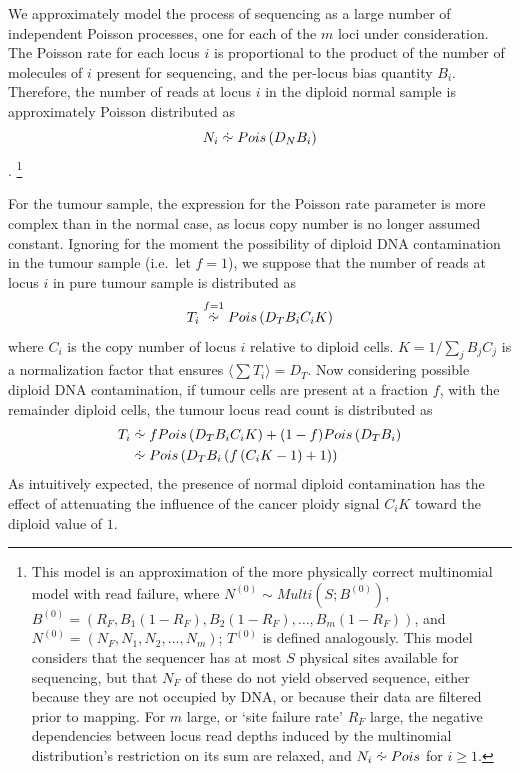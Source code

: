 \documentclass[thesis.tex]{subfiles}
\begin{document}
We approximately model the process of sequencing as a large number of independent Poisson processes, one for each of the $m$ loci under consideration.  The Poisson rate for each locus $i$ is proportional to the product of the number of molecules of $i$ present for sequencing, and the per-locus bias quantity $B_i$.  Therefore, the number of reads at locus $i$ in the diploid normal sample is approximately Poisson distributed as
\begin{equation}
  N_i \approxdist Pois\left(D_N B_i\right) \label{eq:comp_cnv_Npois}
\end{equation}. \footnote{This model is an approximation of the more physically correct multinomial model with read failure, where $N^{(0)} \sim Multi\left(S; B^{(0)}\right)$, $B^{(0)} = \left(R_F, B_1(1-R_F), B_2(1-R_F), \dots, B_m(1-R_F)\right)$, and $N^{(0)} = \left(N_F, N_1, N_2, \dots, N_m\right)$; $T^{(0)}$ is defined analogously.  This model considers that the sequencer has at most $S$ physical sites available for sequencing, but that $N_F$ of these do not yield observed sequence, either because they are not occupied by DNA, or because their data are filtered prior to mapping.  For $m$ large, or `site failure rate' $R_F$ large, the negative dependencies between locus read depths induced by the multinomial distribution's restriction on its sum are relaxed, and $N_i \approxdist Pois$ for $i \geq 1$.}

For the tumour sample, the expression for the Poisson rate parameter is more complex than in the normal case, as locus copy number is no longer assumed constant.  Ignoring for the moment the possibility of diploid DNA contamination in the tumour sample (i.e.\ let $f = 1$), we suppose that the number of reads at locus $i$ in pure tumour sample is distributed as
\begin{equation}
  T_i \overset{f = 1}{\approxdist} Pois\left(D_T B_i C_i K \right)
  \label{eq:comp_cnv_Tpois_pure}
\end{equation}
where $C_i$ is the copy number of locus $i$ relative to diploid cells.  $K = 1/\sum_{j} B_j C_j$ is a normalization factor that ensures $\langle \sum T_i \rangle = D_T$.  Now considering possible diploid DNA contamination, if tumour cells are present at a fraction $f$, with the remainder diploid cells, the tumour locus read count is distributed as
\begin{align}
  T_i &\approxdist f Pois\left(D_T B_i C_i K \right) + (1-f) Pois\left(D_T B_i\right) \\
      &\approxdist Pois\left(D_T B_i \left( f \left( C_i K - 1 \right) + 1 \right) \right) \label{eq:comp_cnv_Tpois}
\end{align}
As intuitively expected, the presence of normal diploid contamination has the effect of attenuating the influence of the cancer ploidy signal $C_i K$ toward the diploid value of $1$.
\end{document}
